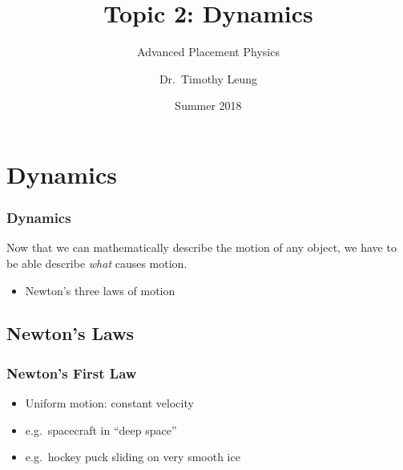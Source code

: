 \documentclass[12pt,compress,aspectratio=169]{beamer}
\title{Topic 2: Dynamics}
\subtitle{Advanced Placement Physics}
\author[TML]{Dr.\ Timothy Leung}
\institute{Olympiads School}
\date{Summer 2018}
\begin{document}
\section{Dynamics}

\begin{frame}
  \frametitle{Dynamics}
  Now that we can mathematically describe the motion of any object, we have to
  be able describe \emph{what} causes motion.
  \begin{itemize}
  \item Newton's three laws of motion
  \end{itemize}
\end{frame}



\subsection{Newton's Laws}

\begin{frame}
  \frametitle{Newton's First Law}
  \begin{center}
  \end{center}

  \vspace{.3in}
  \begin{itemize}
  \item Uniform motion: constant velocity
  \item e.g.\ spacecraft in ``deep space''
  \item e.g.\ hockey puck sliding on very smooth ice
  \end{itemize}
\end{frame}
\end{document}
